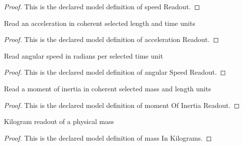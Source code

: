 \begin{proof}
  This is the declared model definition of speed Readout.
\end{proof}
\begin{definition}
  \label{def:physics:phyx-mini-0779:phyxminiproblems-problemphyxmini0779-accelerationreadout}
  Read an acceleration in coherent selected length and time units
\end{definition}
\begin{proof}
  This is the declared model definition of acceleration Readout.
\end{proof}
\begin{definition}
  \label{def:physics:phyx-mini-0779:phyxminiproblems-problemphyxmini0779-angularspeedreadout}
  Read angular speed in radians per selected time unit
\end{definition}
\begin{proof}
  This is the declared model definition of angular Speed Readout.
\end{proof}
\begin{definition}
  \label{def:physics:phyx-mini-0779:phyxminiproblems-problemphyxmini0779-momentofinertiareadout}
  Read a moment of inertia in coherent selected mass and length units
\end{definition}
\begin{proof}
  This is the declared model definition of moment Of Inertia Readout.
\end{proof}
\begin{definition}
  \label{def:physics:phyx-mini-0779:phyxminiproblems-problemphyxmini0779-massinkilograms}
  Kilogram readout of a physical mass
\end{definition}
\begin{proof}
  This is the declared model definition of mass In Kilograms.
\end{proof}
